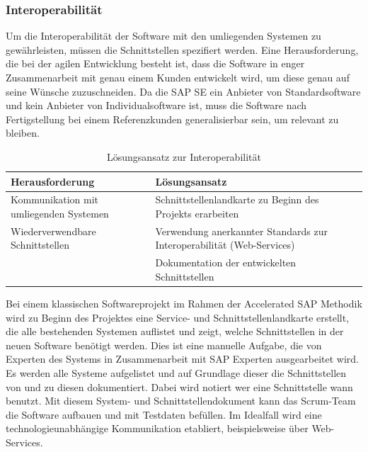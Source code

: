             \subsubsection{Interoperabilität}

                Um die Interoperabilität der Software mit den umliegenden Systemen zu gewährleisten, müssen die Schnittstellen spezifiert werden. Eine Herausforderung, die bei der agilen Entwicklung besteht ist, dass die Software in enger Zusammenarbeit mit genau einem Kunden entwickelt wird, um diese genau auf seine Wünsche zuzuschneiden. Da die SAP SE ein Anbieter von Standardsoftware und kein Anbieter von Individualsoftware ist, muss die Software nach Fertigstellung bei einem Referenzkunden generalisierbar sein, um relevant zu bleiben.

                \begin{table}[H]
                    \begin{tabularx}{\textwidth}{|X|X|}
                        \hline
                        Herausforderung & Lösungsansatz \\
                        \hline
                        Kommunikation mit umliegenden Systemen & Schnittstellenlandkarte zu Beginn des Projekts erarbeiten \\
                        \vspace{0.5\baselineskip}
                        Wiederverwendbare Schnittstellen & \vspace{0.5\baselineskip} Verwendung anerkannter Standards zur Interoperabilität (Web-Services) \\
                        & Dokumentation der entwickelten Schnittstellen \\
                        \hline
                    \end{tabularx}
                    \caption{Lösungsansatz zur Interoperabilität}
                \end{table}

                Bei einem klassischen Softwareprojekt im Rahmen der Accelerated SAP Methodik wird zu Beginn des Projektes eine Service- und Schnittstellenlandkarte erstellt, die alle bestehenden Systemen auflistet und zeigt, welche Schnittstellen in der neuen Software benötigt werden.
                Dies ist eine manuelle Aufgabe, die von Experten des Systems in Zusammenarbeit mit SAP Experten ausgearbeitet wird. Es werden alle Systeme aufgelistet und auf Grundlage dieser die Schnittstellen von und zu diesen dokumentiert. Dabei wird notiert wer eine Schnittstelle wann benutzt. Mit diesem System- und Schnittstellendokument kann das Scrum-Team die Software aufbauen und mit Testdaten befüllen. Im Idealfall wird eine technologieunabhängige Kommunikation etabliert, beispielsweise über Web-Services.

